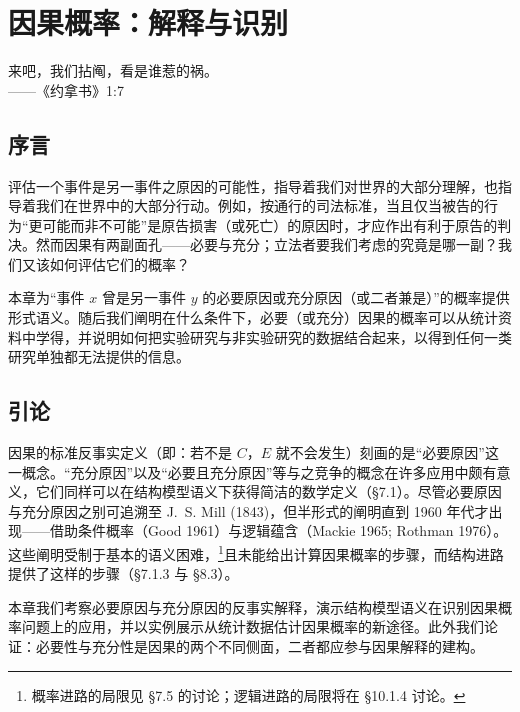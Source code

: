 \chapter{因果概率：解释与识别}

\begin{flushright}
\kaishu\small
来吧，我们拈阄，看是谁惹的祸。\\[2pt]
——《约拿书》1:7
\end{flushright}

\section*{序言}

评估一个事件是另一事件之原因的可能性，指导着我们对世界的大部分理解，也指导着我们在世界中的大部分行动。例如，按通行的司法标准，当且仅当被告的行为“更可能而非不可能”是原告损害（或死亡）的原因时，才应作出有利于原告的判决。然而因果有两副面孔——必要与充分；立法者要我们考虑的究竟是哪一副？我们又该如何评估它们的概率？

本章为“事件 $x$ 曾是另一事件 $y$ 的必要原因或充分原因（或二者兼是）”的概率提供形式语义。随后我们阐明在什么条件下，必要（或充分）因果的概率可以从统计资料中学得，并说明如何把实验研究与非实验研究的数据结合起来，以得到任何一类研究单独都无法提供的信息。

\section{引论}

因果的标准反事实定义（即：若不是 $C$，$E$ 就不会发生）刻画的是“必要原因”这一概念。“充分原因”以及“必要且充分原因”等与之竞争的概念在许多应用中颇有意义，它们同样可以在结构模型语义下获得简洁的数学定义（\S 7.1）。尽管必要原因与充分原因之别可追溯至 J.~S. Mill (1843)，但半形式的阐明直到 1960 年代才出现——借助条件概率（Good 1961）与逻辑蕴含（Mackie 1965; Rothman 1976）。这些阐明受制于基本的语义困难，\footnote{概率进路的局限见 \S 7.5 的讨论；逻辑进路的局限将在 \S 10.1.4 讨论。}且未能给出计算因果概率的步骤，而结构进路提供了这样的步骤（\S 7.1.3 与 \S 8.3）。

本章我们考察必要原因与充分原因的反事实解释，演示结构模型语义在识别因果概率问题上的应用，并以实例展示从统计数据估计因果概率的新途径。此外我们论证：必要性与充分性是因果的两个不同侧面，二者都应参与因果解释的建构。


